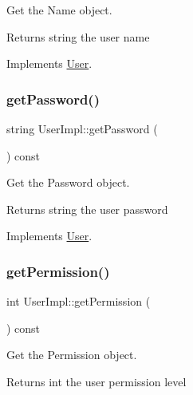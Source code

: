 Get the Name object. 

\begin{DoxyReturn}{Returns}
string the user name 
\end{DoxyReturn}


Implements \hyperlink{classUser_a10b64aca04c37b66fcb5a112e87f97ac}{User}.

\mbox{\label{classUserImpl_a984ad7c34f6893ad4c06bb7d31b0afb0}} 
\subsubsection{\texorpdfstring{get\+Password()}{getPassword()}}
{\footnotesize\ttfamily string User\+Impl\+::get\+Password (\begin{DoxyParamCaption}{ }\end{DoxyParamCaption}) const\hspace{0.3cm}{\ttfamily [virtual]}}



Get the Password object. 

\begin{DoxyReturn}{Returns}
string the user password 
\end{DoxyReturn}


Implements \hyperlink{classUser_a29d4b884ba9f2a3f28a77368c86239fd}{User}.

\mbox{\label{classUserImpl_ac2233b5f85222b2db6a1877083374973}} 
\subsubsection{\texorpdfstring{get\+Permission()}{getPermission()}}
{\footnotesize\ttfamily int User\+Impl\+::get\+Permission (\begin{DoxyParamCaption}{ }\end{DoxyParamCaption}) const\hspace{0.3cm}{\ttfamily [virtual]}}



Get the Permission object. 

\begin{DoxyReturn}{Returns}
int the user permission level 
\end{DoxyReturn}



